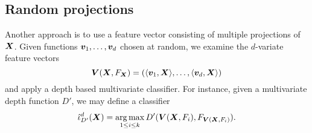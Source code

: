 \subsection{Random projections}

Another approach is to use a feature vector consisting of multiple projections
of $\bm{X}$.
Given functions $\bm{v}_1, \dots, \bm{v}_d$ chosen at random, we examine the
$d$-variate feature vectors
\begin{equation}
    \bm{V}(\bm{X}, F_{\bm{X}}) = \left(\langle \bm{v}_1, \bm{X} \rangle, \dots, \langle \bm{v}_d, \bm{X} \rangle\right)
\end{equation}
and apply a depth based multivariate classifier.
For instance, given a multivariate depth function $D'$, we may define a
classifier
\begin{equation}
    \hat{\iota}^d_{D'}(\bm{X}) = \operatorname*{arg\,max}_{1 \leq i \leq k} D'(\bm{V}(\bm{X}, F_i), F_{\bm{V}(\bm{X}, F_i)}).
\end{equation}
